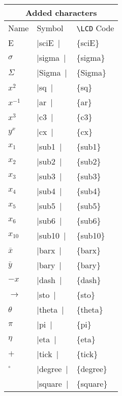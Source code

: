 \documentclass[a4paper,12pt]{article}
\newcommand{\LCDsymb}[1]{\large \textLCD{1}|{#1}~|}
\begin{document}
\begin{center}
	\begin{longtable}{|l|l|>{\ttfamily}l|}
		\multicolumn{3}{c}{\textbf{Added characters}} \\
		\hline
		Name             & Symbol              & \verb|\LCD| \textnormal{Code} \\
		\hline
		E                & \LCDsymb{sciE}      & \{sciE\} \\
		$\sigma$         & \LCDsymb{sigma}     & \{sigma\} \\
		$\Sigma$         & \LCDsymb{Sigma}     & \{Sigma\} \\
		$x^2$            & \LCDsymb{sq}        & \{sq\} \\
		$x^{-1}$         & \LCDsymb{ar}        & \{ar\} \\
		$x^3$            & \LCDsymb{c3}        & \{c3\} \\
		$y^x$            & \LCDsymb{cx}        & \{cx\} \\
		$x_1$            & \LCDsymb{sub1}      & \{sub1\} \\
		$x_2$            & \LCDsymb{sub2}      & \{sub2\} \\
		$x_3$            & \LCDsymb{sub3}      & \{sub3\} \\
		$x_4$            & \LCDsymb{sub4}      & \{sub4\} \\
		$x_5$            & \LCDsymb{sub5}      & \{sub5\} \\
		$x_6$            & \LCDsymb{sub6}      & \{sub6\} \\
		$x_{10}$         & \LCDsymb{sub10}     & \{sub10\} \\
		$\bar x$         & \LCDsymb{barx}      & \{barx\} \\
		$\bar y$         & \LCDsymb{bary}      & \{bary\} \\
		$-x$             & \LCDsymb{dash}      & \{dash\} \\
		$\rightarrow$    & \LCDsymb{sto}       & \{sto\} \\
		$\theta$         & \LCDsymb{theta}     & \{theta\} \\
		$\pi$            & \LCDsymb{pi}        & \{pi\} \\
		$\eta$           & \LCDsymb{eta}       & \{eta\} \\
		$+$              & \LCDsymb{tick}      & \{tick\} \\
		$^\circ$         & \LCDsymb{degree}    & \{degree\} \\
		                 & \LCDsymb{square}    & \{square\} \\

\end{longtable}
\end{center}
\end{document}
